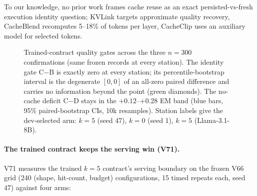 \begin{table}[H]
\centering\footnotesize
\caption{Original-model reference (V109) and D-arm decomposition (V110) on
the frozen confirmation300 records, with paired C$-$arm deltas against the
pinned V70 C arm.}
\label{tab:arms}
\end{table}

To our knowledge, no prior work frames cache reuse as an exact
persisted-vs-fresh execution identity question; KVLink
\citep{yang2025kvlink} targets approximate quality recovery, CacheBlend
\citep{yao2025cacheblend} recomputes 5--18\% of tokens per layer, CacheClip
\citep{yang2025cacheclip} uses an auxiliary model for selected tokens.

\begin{table}[H]
\centering\footnotesize
\caption{Trained reuse-contract confirmation (V70, seed 47, $k{=}5$). 300
confirmation records (V62 confirmation100 included; untouched by training
and selection), paired bootstrap (10k, seed 47, margin $-0.02$). C$-$B
exactly zero (degenerate CI); C$-$D passes. A and D are diagnostics on the
same trained checkpoint.}
\label{tab:v70gates}
\end{table}

\begin{figure}[H]
\centering

\caption{Trained-contract quality gates across the three $n{=}300$
confirmations (same frozen records at every station). The identity gate
C$-$B is exactly zero at every station; its percentile-bootstrap interval
is the degenerate $[0,0]$ of an all-zero paired difference and carries no
information beyond the point (green diamonds). The no-cache deficit C$-$D
stays in the $+0.12$--$+0.28$ EM band (blue bars, 95\% paired-bootstrap
CIs, 10k resamples). Station labels give the dev-selected arm: $k{=}5$
(seed 47), $k{=}0$ (seed 1), $k{=}5$ (Llama-3.1-8B).}
\label{fig:gatedeltas}
\end{figure}

\paragraph{The trained contract keeps the serving win (V71).}
V71 measures the trained $k{=}5$ contract's serving boundary on the frozen
V66 grid (240 (shape, hit-count, budget) configurations, 15 timed repeats
each, seed 47) against four arms:

